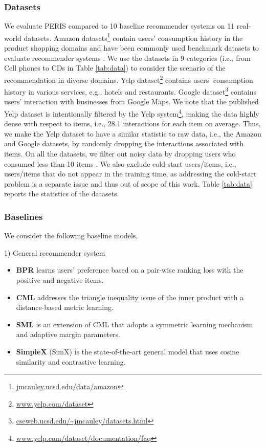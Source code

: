 \documentclass[sigconf]{acmart}
\newcommand{\MD}{{\small\textsf{PERIS}}}
\begin{document}
\subsubsection{\textbf{Datasets}}
We evaluate \MD{} compared to 10 baseline recommender systems on 11 real-world datasets. Amazon datasets\footnote{\url{jmcauley.ucsd.edu/data/amazon}} contain users' consumption history in the product shopping domains and have been commonly used benchmark datasets to evaluate recommender systems \cite{ma2019hierarchical,mao2021simplex}. We use the datasets in 9 categories (i.e., from Cell phones to CDs in Table \ref{tab:data}) to consider the scenario of the recommendation in diverse domains. Yelp dataset\footnote{\url{www.yelp.com/dataset}} contains users' consumption history in various services, e.g., hotels and restaurants.
Google dataset\footnote{\url{cseweb.ucsd.edu/~jmcauley/datasets.html}} contains users' interaction with businesses from Google Maps.
We note that the published Yelp dataset is intentionally filtered by the Yelp system\footnote{\url{www.yelp.com/dataset/documentation/faq}}, making the data highly dense with respect to items, i.e., 28.1 interactions for each item on average. Thus, we make the Yelp dataset to have a similar statistic to raw data, i.e., the Amazon and Google datasets, by randomly dropping the interactions associated with items.  
On all the datasets, we filter out noisy data by dropping users who consumed less than 10 items \cite{hsieh2017collaborative,tang2018personalized,li2020symmetric}. 
We also exclude cold-start users/items, i.e., users/items that do not appear in the training time, as addressing the cold-start problem is a separate issue \cite{volkovs2017content,elkahky2015multi} and thus out of scope of this work.
Table \ref{tab:data} reports the statistics of the datasets. 
\subsubsection{\textbf{Baselines}}
We consider the following baseline models. 


1) General recommender system
\begin{itemize}
    \item[] \textbf{BPR} \cite{rendle2012bpr} learns users' preference based on a pair-wise ranking loss with the positive and negative items.
    \item[] \textbf{CML} \cite{hsieh2017collaborative}  addresses the triangle inequality issue of the inner product with a distance-based metric learning.
    \item[] \textbf{SML} \cite{li2020symmetric} is an extension of CML that adopts a symmetric learning mechanism and adaptive margin parameters.
    \item[] \textbf{SimpleX} (SimX) \cite{mao2021simplex} is the state-of-the-art general model that uses cosine similarity and contrastive learning.
\end{itemize}
\end{document}
